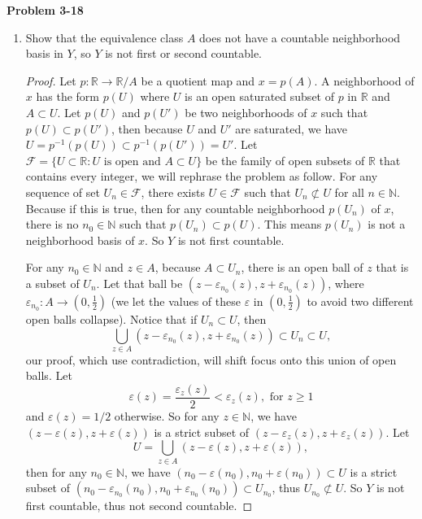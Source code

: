 \documentclass[12pt, a4paper]{article}
\theoremstyle{plain}
\newcommand{\N}{\mathbb{N}}
\newcommand{\R}{\mathbb{R}}
\newcommand{\F}{\mathcal{F}}
\def\epsilon{\varepsilon}
\newenvironment{problem}[2][Problem]
    { \begin{mdframed}[backgroundcolor=gray!20] \textbf{#1 #2} \\}
    {  \end{mdframed}}
\begin{document}
\begin{problem}{3-18}
\begin{enumerate}[label=(\alph*)]
\begin{proof}
	In conclusion, the wedge sum of countable infinitely many circle is homeomorphism to $X$, which is homeomorphism to $\R/A$.
	\end{proof}
\item Show that the equivalence class $A$ does not have a countable neighborhood basis in $Y$, so $Y$ is not first or second countable.
	\begin{proof}
	Let $p:\R\rightarrow \R/A$ be a quotient map and $x=p(A)$. A neighborhood of $x$ has the form $p(U)$ where $U$ is an open saturated subset of $p$ in $\R$ and $A\subset U$. Let $p(U)$ and $p(U')$ be two neighborhoods of $x$ such that $p(U)\subset p(U')$, then because $U$ and $U'$ are saturated, we have $U=p^{-1}(p(U))\subset p^{-1}(p(U'))=U'$. Let $\F=\{U\subset \R: U \text{ is open and } A\subset U\}$ be the family of open subsets of $\R$ that contains every integer, we will rephrase the problem as follow. For any sequence of set $U_n\in\F$, there exists $U\in\F$ such that $U_n\not\subset U$ for all $n\in\N$. Because if this is true, then for any countable neighborhood $p(U_n)$ of $x$, there is no $n_0\in \N$ such that $p(U_n)\subset p(U)$. This means $p(U_n)$ is not a neighborhood basis of $x$. So $Y$ is not first countable. 
	
	For any $n_0\in\N$ and $z\in A$, because $A\subset U_n$, there is an open ball of $z$ that is a subset of $U_n$. Let that ball be $(z-\epsilon_{n_0}(z),z+\epsilon_{n_0}(z))$, where $\epsilon_{n_0}:A\rightarrow (0,\frac{1}{2})$ (we let the values of these $\epsilon$ in $(0,\frac{1}{2})$ to avoid two different open balls collapse). Notice that if $U_n\subset U$, then
	\[
	\bigcup_{z\in A}(z-\epsilon_{n_0}(z),z+\epsilon_{n_0}(z))\subset U_n\subset U,
	\]
	our proof, which use contradiction, will shift focus onto this union of open balls. Let 
	\[
	\epsilon(z)=\frac{\epsilon_z(z)}{2}<\epsilon_z(z), \text{ for } z\geq 1
	\]
	and $\epsilon(z)=1/2$ otherwise. So for any $z\in \N$, we have $(z-\epsilon(z),z+\epsilon(z))$ is a strict subset of $(z-\epsilon_z(z),z+\epsilon_z(z))$. Let
	\[
	U=\bigcup_{z\in A}(z-\epsilon(z),z+\epsilon(z)),
	\]
	then for any $n_0\in \N$, we have $(n_0-\epsilon(n_0),n_0+\epsilon(n_0))\subset U$ is a strict subset of $(n_0-\epsilon_{n_0}(n_0),n_0+\epsilon_{n_0}(n_0))\subset U_{n_0}$, thus $U_{n_0}\not\subset U$. So $Y$ is not first countable, thus not second countable.
	\end{proof}
\end{enumerate}
\end{problem}
\end{document}
